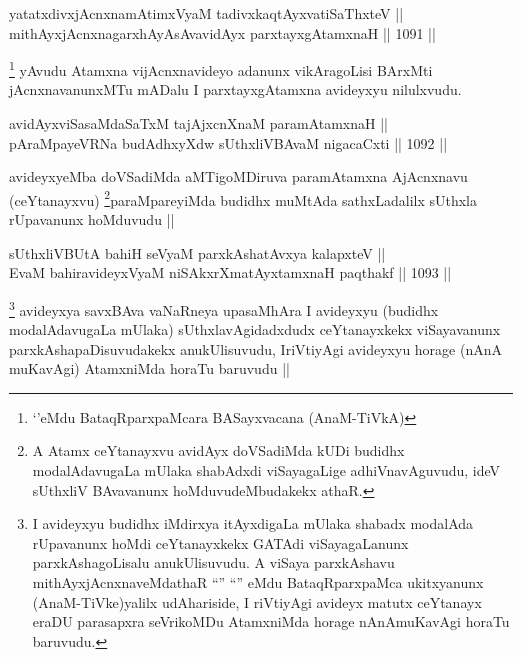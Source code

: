 
\begin{shl}
yatatxdivxjAcnxnamAtimxVyaM tadivxkaqtAyxvatiSaThxteV || \\
mithAyxjAcnxnagarxhAyAsAvavidAyx parxtayxgAtamxnaH ||  1091 || 
\end{shl}

\begin{artha}
\footnote{`\stext'eMdu BataqRparxpaMcara BASayxvacana (AnaM-TiVkA)}
yAvudu Atamxna vijAcnxnavideyo adanunx vikAragoLisi BArxMti jAcnxnavanunxMTu mADalu I parxtayxgAtamxna avideyxyu nilulxvudu.
\end{artha}


\begin{shl}
avidAyxviSasaMdaSaTxM tajAjxcnXnaM paramAtamxnaH || \\
pAraMpayeVRNa budAdhxyXdw sUthxliVBAvaM nigacaCxti ||  1092 ||  
\end{shl}

\begin{artha}
avideyxyeMba doVSadiMda aMTigoMDiruva paramAtamxna AjAcnxnavu (ceYtanayxvu) \footnote{A Atamx ceYtanayxvu avidAyx doVSadiMda kUDi budidhx modalAdavugaLa mUlaka shabAdxdi viSayagaLige adhiVnavAguvudu, ideV sUthxliV BAvavanunx hoMduvudeMbudakekx athaR.}paraMpareyiMda budidhx muMtAda sathxLadalilx sUthxla rUpavanunx hoMduvudu ||
\end{artha}


\begin{shl}
sUthxliVBUtA bahiH seVyaM parxkAshatAvxya kalapxteV || \\
EvaM bahiravideyxVyaM niSAkxrXmatAyxtamxnaH paqthakf ||  1093 ||  
\end{shl}

\begin{artha}
\footnote{I avideyxyu budidhx iMdirxya itAyxdigaLa mUlaka shabadx modalAda rUpavanunx hoMdi ceYtanayxkekx GATAdi viSayagaLanunx parxkAshagoLisalu anukUlisuvudu. A viSaya parxkAshavu mithAyxjAcnxnaveMdathaR ``\stext'' ``\stext'' eMdu BataqRparxpaMca ukitxyanunx (AnaM-TiVke)yalilx udAhariside, I riVtiyAgi avideyx matutx ceYtanayx eraDU parasapxra seVrikoMDu AtamxniMda horage nAnAmuKavAgi horaTu baruvudu.}
avideyxya savxBAva vaNaRneya upasaMhAra I avideyxyu (budidhx modalAdavugaLa mUlaka) sUthxlavAgidadxdudx ceYtanayxkekx viSayavanunx parxkAshapaDisuvudakekx anukUlisuvudu, IriVtiyAgi avideyxyu horage (nAnA muKavAgi) AtamxniMda horaTu baruvudu ||
\end{artha}


